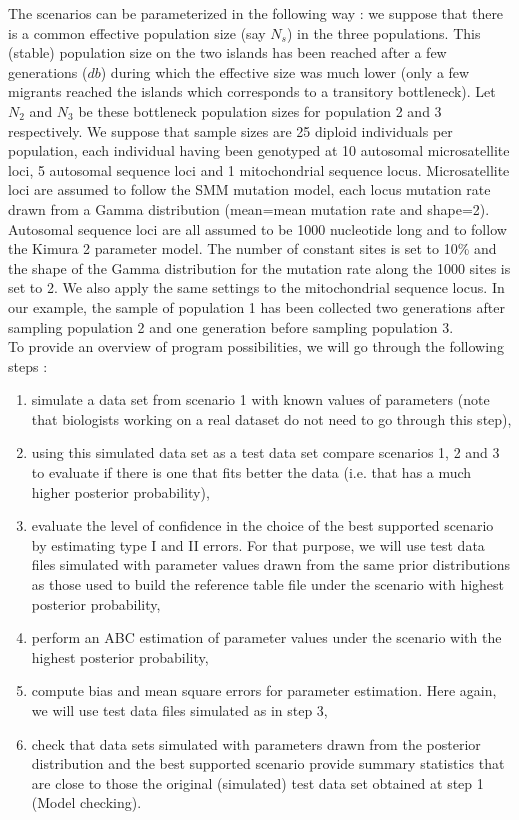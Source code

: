 The scenarios can be parameterized in the following way : we suppose that there is a common effective population size (say $N_s$) in the three populations. This (stable) population size on the two islands has been reached after a few generations ($db$) during which the effective size was much lower (only a few migrants reached the islands which corresponds to a transitory bottleneck). Let $N_2$ and $N_3$ be these bottleneck population sizes for population 2 and 3 respectively.
We suppose that sample sizes are 25 diploid individuals per population, each individual having been genotyped at 10 autosomal microsatellite loci, 5 autosomal sequence loci and 1 mitochondrial sequence locus. Microsatellite loci are assumed to follow the SMM mutation model, each locus mutation rate drawn from a Gamma distribution (mean=mean mutation rate and shape=2). Autosomal sequence loci are all assumed to be 1000 nucleotide long and to follow the Kimura 2 parameter model. The number of constant sites is set to 10\% and the shape of the Gamma distribution for the mutation rate along the 1000 sites is set to 2. We also apply the same settings to the mitochondrial sequence locus. In our example, the sample of population 1 has been collected two generations after sampling population 2 and one generation before sampling population 3.\\


To provide an overview of program possibilities, we will go through the following steps :
\begin{enumerate}
\item simulate a data set  from scenario 1 with known values of parameters (note that biologists working on a real dataset do not need to go through this step),
\item using this simulated data set as a test data set compare scenarios 1, 2 and 3 to evaluate if there is one that fits better the data (i.e. that has a much higher posterior probability),
\item evaluate the level of confidence in the choice of the best supported scenario by estimating type I and II errors.  For that purpose, we will use test data files simulated with parameter values drawn from the same prior distributions as those used to build the reference table file under the scenario with highest posterior probability,
\item perform an ABC estimation of parameter values under the scenario with the highest posterior probability,
\item compute bias and mean square errors for parameter estimation. Here again, we will use test data files simulated as in step 3,
\item check that  data sets simulated with parameters drawn from the posterior distribution and the best supported scenario provide summary statistics that are close to those the original (simulated) test data set obtained at step 1 (Model checking).
\end{enumerate}

